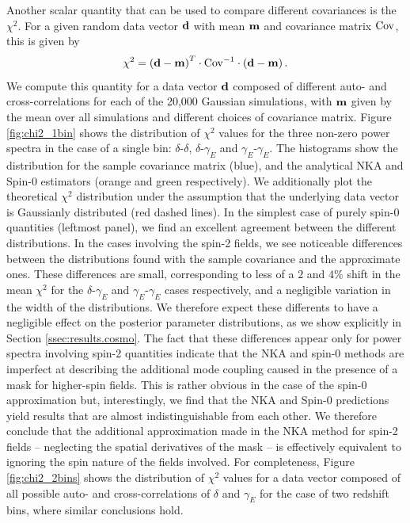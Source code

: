 \documentclass[a4paper,11pt]{article}
\begin{document}
      Another scalar quantity that can be used to compare different covariances is the $\chi^2$. For a given random data vector ${\bf d}$ with mean ${\bf m}$ and covariance matrix ${\rm Cov}$, this is given by
      \begin{equation}
        \chi^2=\left({\bf d}-{\bf m}\right)^T\cdot{\rm Cov}^{-1}\cdot\left({\bf d}-{\bf m}\right).
      \end{equation}
      We compute this quantity for a data vector ${\bf d}$ composed of different auto- and cross-correlations for each of the 20,000 Gaussian simulations, with ${\bf m}$ given by the mean over all simulations and different choices of covariance matrix. Figure \ref{fig:chi2_1bin} shows the distribution of $\chi^2$ values for the three non-zero power spectra in the case of a single bin: $\delta$-$\delta$, $\delta$-$\gamma_E$ and $\gamma_E$-$\gamma_E$. The histograms show the distribution for the sample covariance matrix (blue), and the analytical NKA and Spin-0 estimators (orange and green respectively). We additionally plot the theoretical $\chi^2$ distribution under the assumption that the underlying data vector is Gaussianly distributed (red dashed lines). In the simplest case of purely spin-0 quantities (leftmost panel), we find an excellent agreement between the different distributions. In the cases involving the spin-2 fields, we see noticeable differences between the distributions found with the sample covariance and the approximate ones.
      These differences are small, corresponding to less of a $2$ and $4\%$ shift in the mean $\chi^2$ for the $\delta$-$\gamma_E$ and $\gamma_E$-$\gamma_E$ cases respectively, and a negligible variation in the width of the distributions. We therefore expect these differents to have a negligible effect on the posterior parameter distributions, as we show explicitly in Section \ref{ssec:results.cosmo}. The fact that these differences appear only for power spectra involving spin-2 quantities indicate that the NKA and spin-0 methods are imperfect at describing the additional mode coupling caused in the presence of a mask for higher-spin fields. This is rather obvious in the case of the spin-0 approximation but, interestingly, we find that the NKA and Spin-0 predictions yield results that are almost indistinguishable from each other. We therefore conclude that the additional approximation made in the NKA method for spin-2 fields -- neglecting the spatial derivatives of the mask -- is effectively equivalent to ignoring the spin nature of the fields involved. For completeness, Figure \ref{fig:chi2_2bins} shows the distribution of $\chi^2$ values for a data vector composed of all possible auto- and cross-correlations of $\delta$ and $\gamma_E$ for the case of two redshift bins, where similar conclusions hold.
\end{document}

